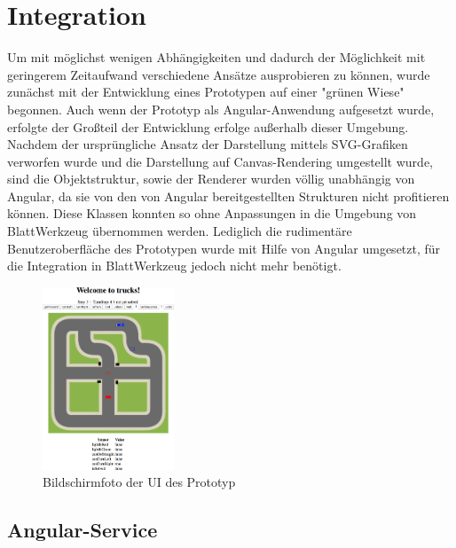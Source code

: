 \section{Integration}
\label{sec:implementation:integration}

Um mit möglichst wenigen Abhängigkeiten und dadurch der Möglichkeit mit geringerem Zeitaufwand verschiedene Ansätze ausprobieren zu können, wurde zunächst mit der Entwicklung eines Prototypen auf einer "grünen Wiese" begonnen. Auch wenn der Prototyp als Angular-Anwendung aufgesetzt wurde, erfolgte der Großteil der Entwicklung erfolge außerhalb dieser Umgebung. Nachdem der ursprüngliche Ansatz der Darstellung mittels SVG-Grafiken verworfen wurde und die Darstellung auf Canvas-Rendering umgestellt wurde, sind die Objektstruktur, sowie der Renderer wurden völlig unabhängig von Angular, da sie von den von Angular bereitgestellten Strukturen nicht profitieren können. Diese Klassen konnten so ohne Anpassungen in die Umgebung von BlattWerkzeug übernommen werden. Lediglich die rudimentäre Benutzeroberfläche des Prototypen  wurde mit Hilfe von Angular umgesetzt, für die Integration in BlattWerkzeug jedoch nicht mehr benötigt.

\begin{figure}
  \centering
  \includegraphics[width=0.35\textwidth]{gfx/implementation-integration-prototype.png}
  \caption{Bildschirmfoto der UI des Prototyp}
  \label{fig:implementation:integration:prototype}
\end{figure}

\subsection{Angular-Service}
\label{sec:implementation:integration:ng-service}

